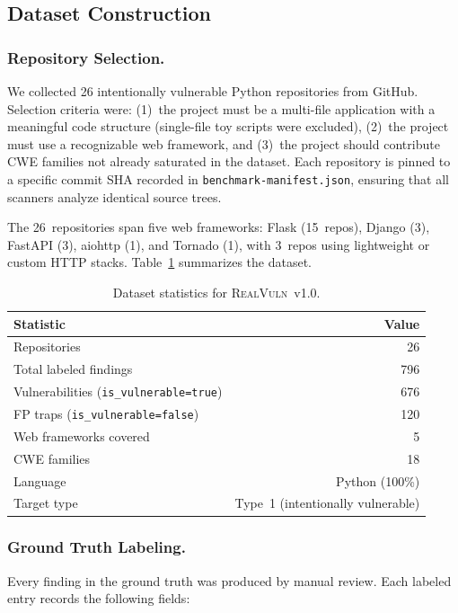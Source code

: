 \subsection{Dataset Construction}
\label{sec:dataset-construction}

\subsubsection{Repository Selection.}
We collected 26 intentionally vulnerable Python repositories from GitHub.
Selection criteria were: (1)~the project must be a multi-file application with a meaningful code structure (single-file toy scripts were excluded), (2)~the project must use a recognizable web framework, and (3)~the project should contribute CWE families not already saturated in the dataset.
Each repository is pinned to a specific commit SHA recorded in \texttt{benchmark-manifest.json}, ensuring that all scanners analyze identical source trees.

The 26~repositories span five web frameworks: Flask (15~repos), Django (3), FastAPI (3), aiohttp (1), and Tornado (1), with 3~repos using lightweight or custom HTTP stacks.
Table~\ref{tab:dataset-stats} summarizes the dataset.

\begin{table}[t]
  \centering
  \caption{Dataset statistics for \textsc{RealVuln}~v1.0.}
  \label{tab:dataset-stats}
  \begin{tabular}{lr}
    \toprule
    \textbf{Statistic} & \textbf{Value} \\
    \midrule
    Repositories                & 26  \\
    Total labeled findings      & 796 \\
    \quad Vulnerabilities (\texttt{is\_vulnerable=true})  & 676 \\
    \quad FP traps (\texttt{is\_vulnerable=false})        & 120 \\
    Web frameworks covered      & 5   \\
    CWE families                & 18  \\
    Language                    & Python (100\%) \\
    Target type                 & Type~1 (intentionally vulnerable) \\
    \bottomrule
  \end{tabular}
\end{table}

\subsubsection{Ground Truth Labeling.}
Every finding in the ground truth was produced by manual review.
Each labeled entry records the following fields:

